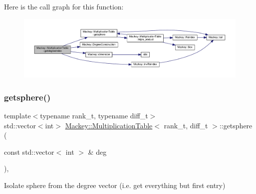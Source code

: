 Here is the call graph for this function\+:\nopagebreak
\begin{figure}[H]
\begin{center}
\leavevmode
\includegraphics[width=350pt]{classMackey_1_1MultiplicationTable_ac15f13c4a9d160226582e1970ef4b00c_cgraph}
\end{center}
\end{figure}
\mbox{\label{classMackey_1_1MultiplicationTable_ad4245f4a8122f0661f969498ef53f999}} 
\subsubsection{\texorpdfstring{getsphere()}{getsphere()}}
{\footnotesize\ttfamily template$<$typename rank\+\_\+t, typename diff\+\_\+t$>$ \\
std\+::vector$<$int$>$ \hyperlink{classMackey_1_1MultiplicationTable}{Mackey\+::\+Multiplication\+Table}$<$ rank\+\_\+t, diff\+\_\+t $>$\+::getsphere (\begin{DoxyParamCaption}\item[{const std\+::vector$<$ int $>$ \&}]{deg }\end{DoxyParamCaption})\hspace{0.3cm}{\ttfamily [inline]}, {\ttfamily [protected]}}



Isolate sphere from the degree vector (i.\+e. get everything but first entry) 

